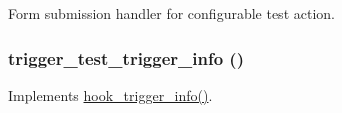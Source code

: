 \label{trigger__test_8module_ab8ed1eb9ab249403641fa7680ffac112}
Form submission handler for configurable test action. \hypertarget{trigger__test_8module_a64b6a660e9aa002c247e7af9f09202a4}{
\subsubsection[{trigger\_\-test\_\-trigger\_\-info}]{\setlength{\rightskip}{0pt plus 5cm}trigger\_\-test\_\-trigger\_\-info ()}}
\label{trigger__test_8module_a64b6a660e9aa002c247e7af9f09202a4}
Implements \hyperlink{group__hooks_ga6796483976be1fa22589582444c6fdbb}{hook\_\-trigger\_\-info()}. 